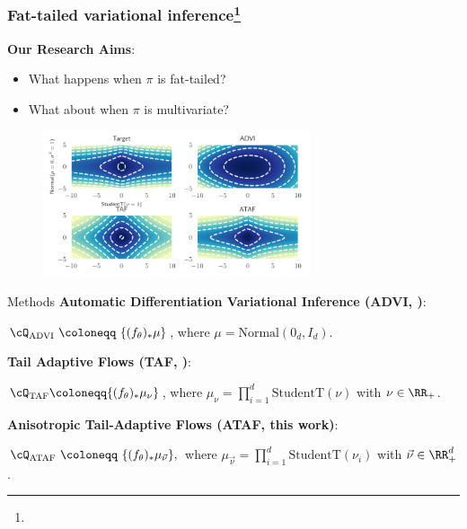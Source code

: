 \begin{frame}
    \frametitle{Fat-tailed variational inference\footnote{}}
    
    \textbf{Our Research Aims}:
    \begin{itemize}
        \item 
        What happens when $\pi$ is fat-tailed?
        \item 
        What about when $\pi$ is multivariate?
    \end{itemize}
    
    
    \begin{figure}[htbp]
      \centering
      \includegraphics[width=0.7\textwidth]{Figures/ftvi/pancake.pdf}
      \label{fig:pancake}
    \end{figure}
\end{frame}

\begin{frame}{Methods}
    \textbf{Automatic Differentiation Variational Inference (ADVI, \cite{kucukelbir2017automatic,webb2019improving})}:
    
      \quad 
      $\cQ_\text{ADVI}~\coloneqq~\{
        (f_\theta)_\ast \mu
        \}$, 
      where $\mu = \text{Normal}(0_d, I_d)$.
      \vspace{3mm}
      
    \pause
    
    \textbf{Tail Adaptive Flows (TAF, \cite{jaini2020tails})}:
    
      \quad 
      $\cQ_\text{TAF}
        \coloneqq \{
        (f_\theta)_\ast \mu_\nu
        \}$,
      where $\mu_\nu = \prod_{i=1}^d \text{StudentT}(\nu)$ with $\nu \in \RR_+$.
      \vspace{3mm}
      
    \pause
    
    \textbf{Anisotropic Tail-Adaptive Flows (ATAF, this work)}:
    
      \quad 
      $\cQ_\text{ATAF}~\coloneqq~\{
        (f_\theta)_\ast \mu_{\vec{\nu}}
        \},$
      where $\mu_{\vec{\nu}} = \prod_{i=1}^d \text{StudentT}(\nu_i)$ with $\vec{\nu} \in \RR_+^d$.
\end{frame}

